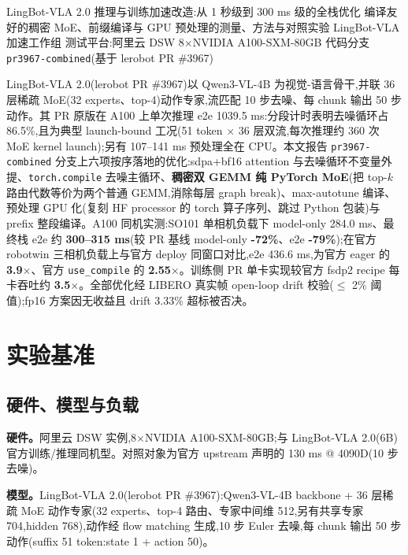 \documentclass[11pt]{ctexart}
\begin{document}
{LingBot-VLA 2.0 推理与训练加速改造:从 1 秒级到 300 ms 级的全栈优化}
{编译友好的稠密 MoE、前缀编译与 GPU 预处理的测量、方法与对照实验}
{LingBot-VLA 加速工作组 \quad 测试平台:阿里云 DSW 8$\times$NVIDIA A100-SXM-80GB \quad 代码分支 \texttt{pr3967-combined}(基于 lerobot PR \#3967)}

\begin{cnabstract}
LingBot-VLA 2.0(lerobot PR \#3967)以 Qwen3-VL-4B 为视觉-语言骨干,并联 36 层稀疏 MoE(32 experts、top-4)动作专家,流匹配 10 步去噪、每 chunk 输出 50 步动作。其 PR 原版在 A100 上单次推理 e2e 1039.5 ms:分段计时表明去噪循环占 86.5\%,且为典型 launch-bound 工况(51 token $\times$ 36 层双流,每次推理约 360 次 MoE kernel launch);另有 107--141 ms 预处理全在 CPU。本文报告 \texttt{pr3967-combined} 分支上六项按序落地的优化:sdpa+bf16 attention 与去噪循环不变量外提、\texttt{torch.compile} 去噪主循环、\textbf{稠密双 GEMM 纯 PyTorch MoE}(把 top-$k$ 路由代数等价为两个普通 GEMM,消除每层 graph break)、max-autotune 编译、预处理 GPU 化(复刻 HF processor 的 torch 算子序列、跳过 Python 包装)与 prefix 整段编译。A100 同机实测:SO101 单相机负载下 model-only 284.0 ms、最终栈 e2e 约 \textbf{300--315 ms}(较 PR 基线 model-only \textbf{-72\%}、e2e \textbf{-79\%});在官方 robotwin 三相机负载上与官方 deploy 同窗口对比,e2e 436.6 ms,为官方 eager 的 \textbf{3.9$\times$}、官方 \texttt{use\_compile} 的 \textbf{2.55$\times$}。训练侧 PR 单卡实现较官方 fsdp2 recipe 每卡吞吐约 \textbf{3.5$\times$}。全部优化经 LIBERO 真实帧 open-loop drift 校验($\le$ 2\% 阈值);fp16 方案因无收益且 drift 3.33\% 超标被否决。
\end{cnabstract}

\section{实验基准}
\subsection{硬件、模型与负载}
\textbf{硬件。}阿里云 DSW 实例,8$\times$NVIDIA A100-SXM-80GB;与 LingBot-VLA 2.0(6B)官方训练/推理同机型。对照对象为官方 upstream 声明的 130 ms @ 4090D(10 步去噪)。

\textbf{模型。}LingBot-VLA 2.0(lerobot PR \#3967):Qwen3-VL-4B backbone + 36 层稀疏 MoE 动作专家(32 experts、top-4 路由、专家中间维 512,另有共享专家 704,hidden 768),动作经 flow matching 生成,10 步 Euler 去噪,每 chunk 输出 50 步动作(suffix 51 token:state 1 + action 50)。
\end{document}
